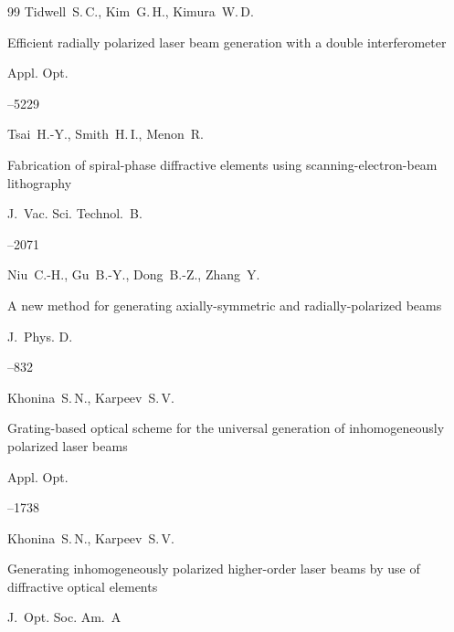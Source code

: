 \begin{thebibliography}{99}
\by Tidwell~S.\,C., Kim~G.\,H., Kimura~W.\,D.

\paper Efficient radially polarized laser beam generation with a double interferometer

\jour Appl. Opt.




--5229




\by Tsai~H.-Y., Smith~H.\,I.,  Menon~R.

\paper Fabrication of spiral-phase diffractive elements using scanning-electron-beam lithography

\jour J.~Vac. Sci. Technol.~B.



--2071





\by Niu~C.-H., Gu~B.-Y., Dong~B.-Z., Zhang~Y.

\paper A new method for generating axially-symmetric and radially-polarized beams

\jour J.~Phys. D.




--832




\by Khonina~S.\,N., Karpeev~S.\,V.

\paper Grating-based optical scheme for the universal generation of inhomogeneously polarized laser beams

\jour Appl. Opt.




--1738




\by Khonina~S.\,N., Karpeev~S.\,V.

\paper Generating inhomogeneously polarized higher-order laser beams by use of diffractive optical elements

\jour J.~Opt. Soc. Am.~A


\end{thebibliography}
